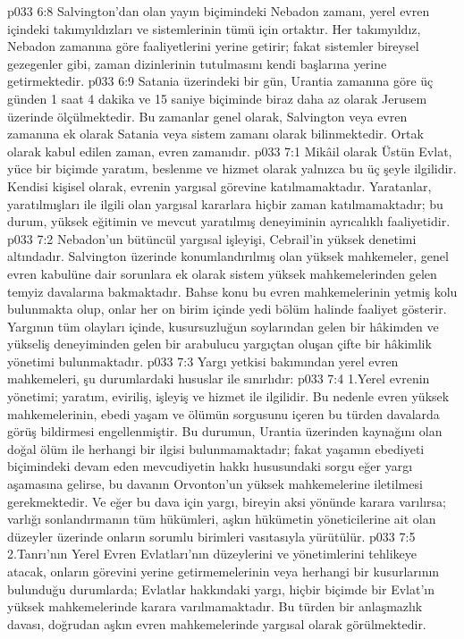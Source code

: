 \vs p033 6:8 Salvington’dan olan yayın biçimindeki Nebadon zamanı, yerel evren içindeki takımyıldızları ve sistemlerinin tümü için ortaktır. Her takımyıldız, Nebadon zamanına göre faaliyetlerini yerine getirir; fakat sistemler bireysel gezegenler gibi, zaman dizinlerinin tutulmasını kendi başlarına yerine getirmektedir.
\vs p033 6:9 Satania üzerindeki bir gün, Urantia zamanına göre üç günden 1 saat 4 dakika ve 15 saniye biçiminde biraz daha az olarak Jerusem üzerinde ölçülmektedir. Bu zamanlar genel olarak, Salvington veya evren zamanına ek olarak Satania veya sistem zamanı olarak bilinmektedir. Ortak olarak kabul edilen zaman, evren zamanıdır.
\vs p033 7:1 Mikâil olarak Üstün Evlat, yüce bir biçimde yaratım, beslenme ve hizmet olarak yalnızca bu üç şeyle ilgilidir. Kendisi kişisel olarak, evrenin yargısal görevine katılmamaktadır. Yaratanlar, yaratılmışları ile ilgili olan yargısal kararlara hiçbir zaman katılmamaktadır; bu durum, yüksek eğitimin ve mevcut yaratılmış deneyiminin ayrıcalıklı faaliyetidir.
\vs p033 7:2 Nebadon’un bütüncül yargısal işleyişi, Cebrail’in yüksek denetimi altındadır. Salvington üzerinde konumlandırılmış olan yüksek mahkemeler, genel evren kabulüne dair sorunlara ek olarak sistem yüksek mahkemelerinden gelen temyiz davalarına bakmaktadır. Bahse konu bu evren mahkemelerinin yetmiş kolu bulunmakta olup, onlar her on birim içinde yedi bölüm halinde faaliyet gösterir. Yargının tüm olayları içinde, kusursuzluğun soylarından gelen bir hâkimden ve yükseliş deneyiminden gelen bir arabulucu yargıçtan oluşan çifte bir hâkimlik yönetimi bulunmaktadır.
\vs p033 7:3 Yargı yetkisi bakımından yerel evren mahkemeleri, şu durumlardaki hususlar ile sınırlıdır:
\vs p033 7:4 1.\bibnobreakspace Yerel evrenin yönetimi; yaratım, eviriliş, işleyiş ve hizmet ile ilgilidir. Bu nedenle evren yüksek mahkemelerinin, ebedi yaşam ve ölümün sorgusunu içeren bu türden davalarda görüş bildirmesi engellenmiştir. Bu durumun, Urantia üzerinden kaynağını olan doğal ölüm ile herhangi bir ilgisi bulunmamaktadır; fakat yaşamın ebediyeti biçimindeki devam eden mevcudiyetin hakkı hususundaki sorgu eğer yargı aşamasına gelirse, bu davanın Orvonton’un yüksek mahkemelerine iletilmesi gerekmektedir. Ve eğer bu dava için yargı, bireyin aksi yönünde karara varılırsa; varlığı sonlandırmanın tüm hükümleri, aşkın hükümetin yöneticilerine ait olan düzeyler üzerinde onların sorumlu birimleri vasıtasıyla yürütülür.
\vs p033 7:5 2.\bibnobreakspace Tanrı’nın Yerel Evren Evlatları’nın düzeylerini ve yönetimlerini tehlikeye atacak, onların görevini yerine getirmemelerinin veya herhangi bir kusurlarının bulunduğu durumlarda; Evlatlar hakkındaki yargı, hiçbir biçimde bir Evlat’ın yüksek mahkemelerinde karara varılmamaktadır. Bu türden bir anlaşmazlık davası, doğrudan aşkın evren mahkemelerinde yargısal olarak görülmektedir.

